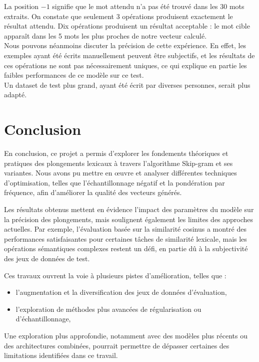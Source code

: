 \documentclass[12pt]{article}
\begin{document}
La position $-1$ signifie que le mot attendu n'a pas été trouvé dans les 30 mots extraits. 
On constate que seulement 3 opérations produisent exactement le résultat attendu. Dix opérations produisent un résultat
acceptable : le mot cible apparaît dans les 5 mots les plus proches de notre vecteur calculé. \\
Nous pouvons néanmoins discuter la précision de cette expérience. En effet, les exemples ayant été écrits manuellement
peuvent être subjectifs, et les résultats de ces opérations ne sont pas nécessairement uniques, ce qui explique en partie les 
faibles performances de ce modèle sur ce test.\\ 
Un dataset de test plus grand, ayant été écrit par diverses personnes, serait plus adapté.


\section{Conclusion}

En conclusion, ce projet a permis d'explorer les fondements théoriques et pratiques des plongements lexicaux à travers l'algorithme Skip-gram et ses variantes. Nous avons pu 
mettre en œuvre et analyser différentes techniques d'optimisation, telles que l'échantillonnage négatif et la pondération par fréquence, afin d'améliorer la qualité des vecteurs générés. 

Les résultats obtenus mettent en évidence l'impact des paramètres du modèle sur la précision des plongements, mais soulignent également les limites des approches actuelles. Par exemple, 
l'évaluation basée sur la similarité cosinus a montré des performances satisfaisantes pour certaines tâches de similarité lexicale, mais les opérations sémantiques complexes restent un défi, 
en partie dû à la subjectivité des jeux de données de test.

Ces travaux ouvrent la voie à plusieurs pistes d'amélioration, telles que :
\begin{itemize}
    \item l'augmentation et la diversification des jeux de données d'évaluation,
    \item l'exploration de méthodes plus avancées de régularisation ou d'échantillonnage,
\end{itemize}

Une exploration plus approfondie, notamment avec des modèles plus récents ou des architectures combinées, pourrait permettre de dépasser certaines des limitations identifiées dans ce travail.



\end{document}
